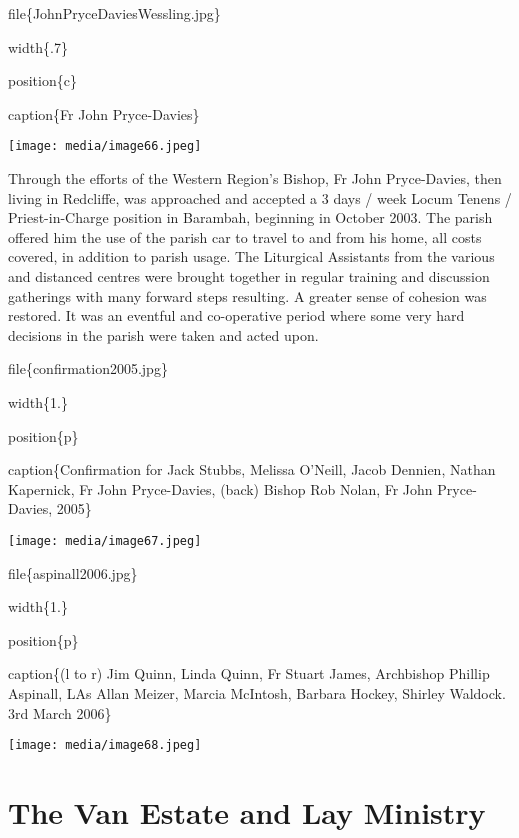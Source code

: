 file\{JohnPryceDaviesWessling.jpg\}

width\{.7\}

position\{c\}

caption\{Fr John Pryce-Davies\}

\texttt{[image: media/image66.jpeg]}

Through the efforts of the Western Region's Bishop, Fr John Pryce-Davies, then living in Redcliffe, was approached and accepted a 3 days / week Locum Tenens / Priest-in-Charge position in Barambah, beginning in October 2003. The parish offered him the use of the parish car to travel to and from his home, all costs covered, in addition to parish usage. The Liturgical Assistants from the various and distanced centres were brought together in regular training and discussion gatherings with many forward steps resulting. A greater sense of cohesion was restored. It was an eventful and co-operative period where some very hard decisions in the parish were taken and acted upon.

file\{confirmation2005.jpg\}

width\{1.\}

position\{p\}

caption\{Confirmation for Jack Stubbs, Melissa O'Neill, Jacob Dennien, Nathan Kapernick, Fr John Pryce-Davies, (back) Bishop Rob Nolan, Fr John Pryce-Davies, 2005\}

\texttt{[image: media/image67.jpeg]}

file\{aspinall2006.jpg\}

width\{1.\}

position\{p\}

caption\{(l to r) Jim Quinn, Linda Quinn, Fr Stuart James, Archbishop Phillip Aspinall, LAs Allan Meizer, Marcia McIntosh, Barbara Hockey, Shirley Waldock. 3rd March 2006\}

\texttt{[image: media/image68.jpeg]}

\hypertarget{the-van-estate-and-lay-ministry}{%
\section{The Van Estate and Lay Ministry}\label{the-van-estate-and-lay-ministry}}

